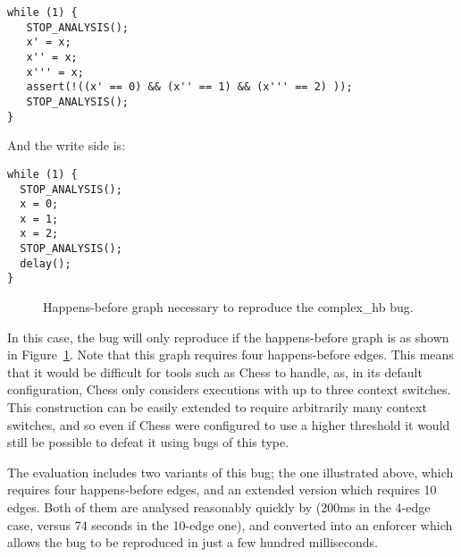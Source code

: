 \begin{verbatim}
while (1) {
   STOP_ANALYSIS();
   x' = x;
   x'' = x;
   x''' = x;
   assert(!((x' == 0) && (x'' == 1) && (x''' == 2) ));
   STOP_ANALYSIS();
}
\end{verbatim}

And the write side is:

\begin{verbatim}
while (1) {
  STOP_ANALYSIS();
  x = 0;
  x = 1;
  x = 2;
  STOP_ANALYSIS();
  delay();
}
\end{verbatim}

\begin{figure}
  \caption{Happens-before graph necessary to reproduce the complex\_hb
    bug.}
  \label{fig:eval:complex_hb}
\end{figure}

In this case, the bug will only reproduce if the happens-before graph
is as shown in Figure~\ref{fig:eval:complex_hb}.  Note that this graph
requires four happens-before edges.  This means that it would be
difficult for tools such as Chess\needCite{} to handle, as, in its
default configuration, Chess only considers executions with up to
three context switches.  This construction can be easily extended to
require arbitrarily many context switches, and so even if Chess were
configured to use a higher threshold it would still be possible to
defeat it using bugs of this type.

The evaluation includes two variants of this bug; the one illustrated
above, which requires four happens-before edges, and an extended
version which requires 10 edges.  Both of them are analysed reasonably
quickly by {\implementation} (200ms in the 4-edge case, versus 74
seconds in the 10-edge one), and converted into an enforcer which
allows the bug to be reproduced in just a few hundred milliseconds.

